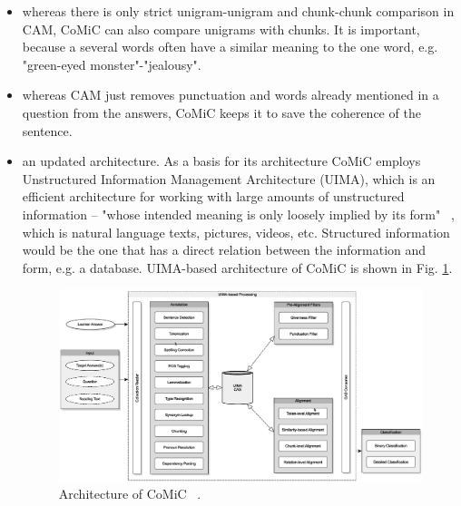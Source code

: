 \begin{itemize}
\item whereas there is only strict unigram-unigram and chunk-chunk comparison in CAM, CoMiC can also compare unigrams with chunks. It is important, because a several words often have a similar meaning to the one word, e.g. "green-eyed monster"-"jealousy".
\item whereas CAM just removes punctuation and words already mentioned in a question from the answers, CoMiC keeps it to save the coherence of the sentence.
\item an updated architecture.  As a basis for its architecture CoMiC employs  Unstructured Information Management Architecture (UIMA), which is an efficient architecture for working with large amounts of unstructured information -- "whose intended meaning is only loosely implied by its form" ~\cite{UIMA}, which is natural language texts, pictures, videos, etc. Structured information would be the one that has a direct relation between the information and form, e.g. a database. UIMA-based architecture of CoMiC is shown in Fig. \ref{fig:UIMA}.

\begin{figure}[h!]
  \centering
  \includegraphics[width=\textwidth]{img/UIMA}
    \caption{ Architecture of CoMiC ~\cite{CoMiC-EN}. }\label{fig:UIMA}
\end{figure}


\end{itemize}
